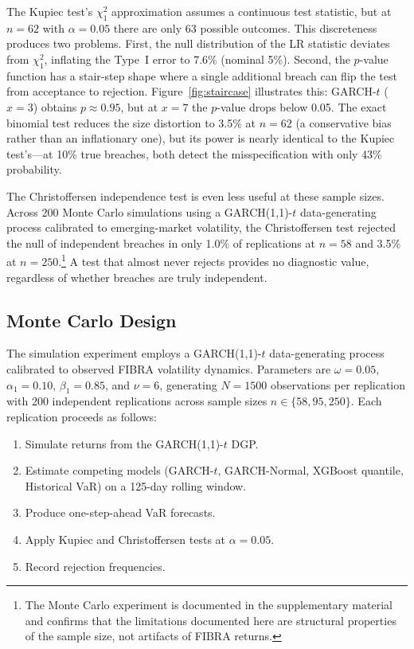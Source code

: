 \documentclass[12pt,a4paper]{article}
\begin{document}
The Kupiec test's $\chi^2_1$ approximation assumes a continuous test statistic, but at $n = 62$ with $\alpha = 0.05$ there are only 63 possible outcomes. This discreteness produces two problems. First, the null distribution of the LR statistic deviates from $\chi^2_1$, inflating the Type~I error to 7.6\% (nominal 5\%). Second, the $p$-value function has a stair-step shape where a single additional breach can flip the test from acceptance to rejection. Figure~\ref{fig:staircase} illustrates this: GARCH-$t$ ($x = 3$) obtains $p \approx 0.95$, but at $x = 7$ the $p$-value drops below 0.05. The exact binomial test reduces the size distortion to 3.5\% at $n = 62$ (a conservative bias rather than an inflationary one), but its power is nearly identical to the Kupiec test's---at 10\% true breaches, both detect the misspecification with only 43\% probability.

The Christoffersen independence test is even less useful at these sample sizes. Across 200 Monte Carlo simulations using a GARCH(1,1)-$t$ data-generating process calibrated to emerging-market volatility, the Christoffersen test rejected the null of independent breaches in only 1.0\% of replications at $n = 58$ and 3.5\% at $n = 250$.\footnote{The Monte Carlo experiment is documented in the supplementary material and confirms that the limitations documented here are structural properties of the sample size, not artifacts of FIBRA returns.} A test that almost never rejects provides no diagnostic value, regardless of whether breaches are truly independent.

\subsection{Monte Carlo Design}

The simulation experiment employs a GARCH(1,1)-$t$ data-generating process calibrated to observed FIBRA volatility dynamics. Parameters are $\omega = 0.05$, $\alpha_1 = 0.10$, $\beta_1 = 0.85$, and $\nu = 6$, generating $N = 1500$ observations per replication with 200 independent replications across sample sizes $n \in \{58, 95, 250\}$. Each replication proceeds as follows:

\begin{enumerate}
    \item Simulate returns from the GARCH(1,1)-$t$ DGP.
    \item Estimate competing models (GARCH-$t$, GARCH-Normal, XGBoost quantile, Historical VaR) on a 125-day rolling window.
    \item Produce one-step-ahead VaR forecasts.
    \item Apply Kupiec and Christoffersen tests at $\alpha = 0.05$.
    \item Record rejection frequencies.
\end{enumerate}
\end{document}
